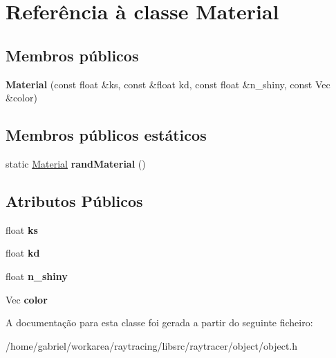 \hypertarget{classMaterial}{}\section{Referência à classe Material}
\label{classMaterial}
\subsection*{Membros públicos}
\begin{DoxyCompactItemize}
\item 
\mbox{\label{classMaterial_a49440e5c169730bbbe452f64a231294d}} 
{\bfseries Material} (const float \&ks, const \&float kd, const float \&n\+\_\+shiny, const Vec \&color)
\end{DoxyCompactItemize}
\subsection*{Membros públicos estáticos}
\begin{DoxyCompactItemize}
\item 
\mbox{\label{classMaterial_ab6a3ae3a1ec4abc634d6bdddb9a5b63f}} 
static \hyperlink{classMaterial}{Material} {\bfseries rand\+Material} ()
\end{DoxyCompactItemize}
\subsection*{Atributos Públicos}
\begin{DoxyCompactItemize}
\item 
\mbox{\label{classMaterial_ae79b3f2a118fa5d47e030396cf1bb9c2}} 
float {\bfseries ks}
\item 
\mbox{\label{classMaterial_a2076127f606e22d9fe55b6be6ca519d1}} 
float {\bfseries kd}
\item 
\mbox{\label{classMaterial_a6bee0b3a16931951becaa33699621983}} 
float {\bfseries n\+\_\+shiny}
\item 
\mbox{\label{classMaterial_a9582259ac6757247d65a4cb7d08708eb}} 
Vec {\bfseries color}
\end{DoxyCompactItemize}


A documentação para esta classe foi gerada a partir do seguinte ficheiro\+:\begin{DoxyCompactItemize}
\item 
/home/gabriel/workarea/raytracing/libsrc/raytracer/object/object.\+h\end{DoxyCompactItemize}

